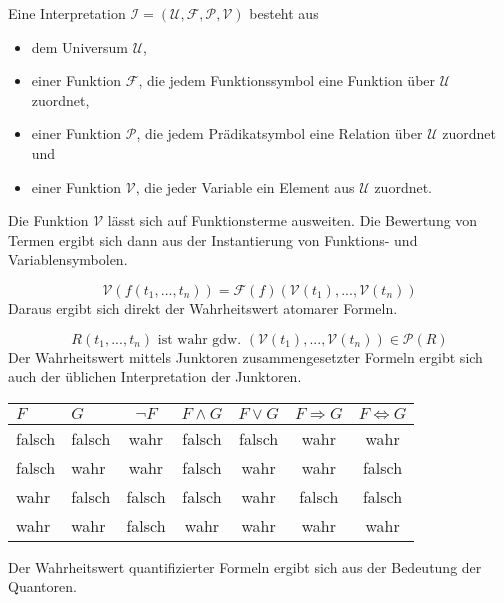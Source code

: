 \begin{leftbar}
  \begin{definition}[Interpretation]
    \newline
    Eine Interpretation $\mathcal{I} = \left ( \mathcal{U},\mathcal{F},\mathcal{P},\mathcal{V} \right )$ besteht aus
    \begin{itemize}
    \item dem Universum $\mathcal{U}$,
    \item einer Funktion $\mathcal{F}$, die jedem Funktionssymbol eine Funktion über $\mathcal{U}$ zuordnet,
    \item einer Funktion $\mathcal{P}$, die jedem Prädikatsymbol eine Relation über $\mathcal{U}$ zuordnet und
      \item einer Funktion $\mathcal{V}$, die jeder Variable ein Element aus $\mathcal{U}$ zuordnet.
    \end{itemize}
  \end{definition}
\end{leftbar}
\noindent
Die Funktion $\mathcal{V}$ lässt sich auf Funktionsterme ausweiten. Die Bewertung von Termen ergibt sich dann aus der Instantierung von Funktions- und Variablensymbolen.

\begin{equation}
  \mathcal{V}(f(t_1,...,t_n)) = \mathcal{F}(f)(\mathcal{V}(t_1),...,\mathcal{V}(t_n))
\end{equation}
\noindent
Daraus ergibt sich direkt der Wahrheitswert atomarer Formeln.

\begin{equation}
  R(t_1,...,t_n) \text{ ist wahr gdw. } (\mathcal{V}(t_1),...,\mathcal{V}(t_n)) \in \mathcal{P}(R)
\end{equation}
\noindent
Der Wahrheitswert mittels Junktoren zusammengesetzter Formeln ergibt sich auch der üblichen Interpretation der Junktoren.
\newline
\begin{center}
\begin{tabular}{ l l | c | c | c | c | c }
  $F$ & $G$ & $\neg F$ & $F \wedge G$ & $F \vee G$ & $F \Rightarrow G$ & $F \Leftrightarrow G$ \\
  \hline
  falsch & falsch & wahr & falsch & falsch & wahr & wahr \\
  falsch & wahr & wahr & falsch & wahr & wahr & falsch \\
  wahr & falsch & falsch & falsch & wahr & falsch & falsch\\
  wahr & wahr & falsch & wahr & wahr & wahr & wahr\\
\end{tabular}
\end{center}
\newline
\newline
\noindent
Der Wahrheitswert quantifizierter Formeln ergibt sich aus der Bedeutung der Quantoren.

